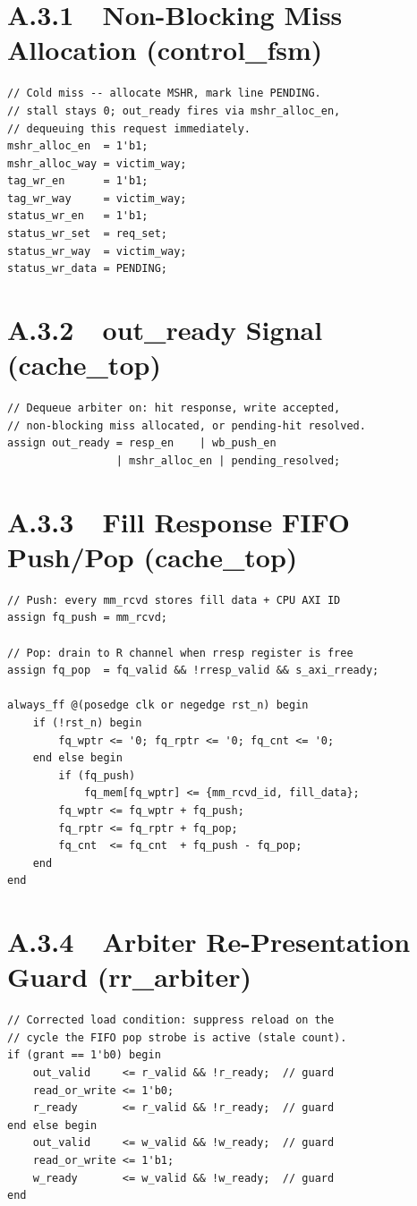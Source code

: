 \documentclass[12pt,letterpaper]{report}
\begin{document}
\section*{A.3.1\ \ Non-Blocking Miss Allocation (control\_fsm)}

\begin{lstlisting}[style=sv]
// Cold miss -- allocate MSHR, mark line PENDING.
// stall stays 0; out_ready fires via mshr_alloc_en,
// dequeuing this request immediately.
mshr_alloc_en  = 1'b1;
mshr_alloc_way = victim_way;
tag_wr_en      = 1'b1;
tag_wr_way     = victim_way;
status_wr_en   = 1'b1;
status_wr_set  = req_set;
status_wr_way  = victim_way;
status_wr_data = PENDING;
\end{lstlisting}

\section*{A.3.2\ \ out\_ready Signal (cache\_top)}

\begin{lstlisting}[style=sv]
// Dequeue arbiter on: hit response, write accepted,
// non-blocking miss allocated, or pending-hit resolved.
assign out_ready = resp_en    | wb_push_en
                 | mshr_alloc_en | pending_resolved;
\end{lstlisting}

\section*{A.3.3\ \ Fill Response FIFO Push/Pop (cache\_top)}

\begin{lstlisting}[style=sv]
// Push: every mm_rcvd stores fill data + CPU AXI ID
assign fq_push = mm_rcvd;

// Pop: drain to R channel when rresp register is free
assign fq_pop  = fq_valid && !rresp_valid && s_axi_rready;

always_ff @(posedge clk or negedge rst_n) begin
    if (!rst_n) begin
        fq_wptr <= '0; fq_rptr <= '0; fq_cnt <= '0;
    end else begin
        if (fq_push)
            fq_mem[fq_wptr] <= {mm_rcvd_id, fill_data};
        fq_wptr <= fq_wptr + fq_push;
        fq_rptr <= fq_rptr + fq_pop;
        fq_cnt  <= fq_cnt  + fq_push - fq_pop;
    end
end
\end{lstlisting}

\section*{A.3.4\ \ Arbiter Re-Presentation Guard (rr\_arbiter)}

\begin{lstlisting}[style=sv]
// Corrected load condition: suppress reload on the
// cycle the FIFO pop strobe is active (stale count).
if (grant == 1'b0) begin
    out_valid     <= r_valid && !r_ready;  // guard
    read_or_write <= 1'b0;
    r_ready       <= r_valid && !r_ready;  // guard
end else begin
    out_valid     <= w_valid && !w_ready;  // guard
    read_or_write <= 1'b1;
    w_ready       <= w_valid && !w_ready;  // guard
end
\end{lstlisting}
\end{document}
